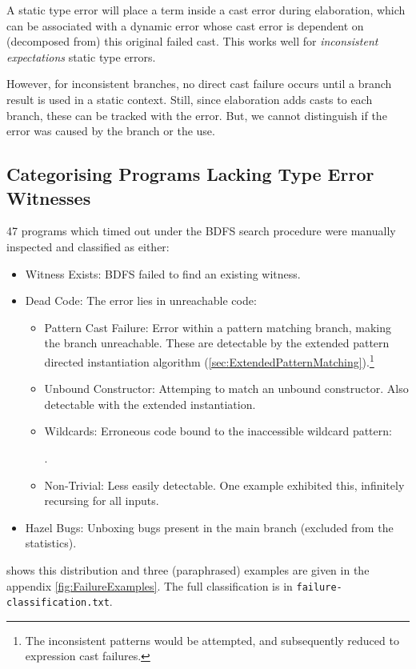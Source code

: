 A static type error will place a term inside a cast error during elaboration, which can be associated with a dynamic error whose cast error is dependent on (decomposed from) this original failed cast. This works well for \textit{inconsistent expectations} static type errors.

However, for inconsistent branches, no direct cast failure occurs until a branch result is used in a static context. Still, since elaboration adds casts to each branch, these can be tracked with the error. But, we cannot distinguish if the error was caused by the branch or the use.
  
\subsection{Categorising Programs Lacking Type Error Witnesses}
47 programs which timed out under the BDFS search procedure were manually inspected and classified as either:
\begin{itemize}
\item Witness Exists: BDFS failed to find an existing witness.
\item Dead Code: The error lies in unreachable code:
\begin{itemize}
\item Pattern Cast Failure: Error within a pattern matching branch, making the branch unreachable. These are detectable by the extended pattern directed instantiation algorithm (\cref{sec:ExtendedPatternMatching}).\footnote{The inconsistent patterns would be attempted, and subsequently reduced to expression cast failures.}
\item Unbound Constructor: Attemping to match an unbound constructor. Also detectable with the extended instantiation.
\item Wildcards: Erroneous code bound to the inaccessible wildcard pattern: 

.
\item Non-Trivial: Less easily detectable. One example exhibited this, infinitely recursing for all inputs.
\end{itemize}
\item Hazel Bugs: Unboxing bugs present in the main branch (excluded from the statistics).
\end{itemize}
 shows this distribution and three (paraphrased) examples are given in the appendix \cref{fig:FailureExamples}. The full classification is in \texttt{failure-classification.txt}.

